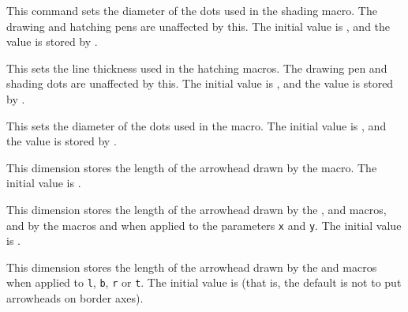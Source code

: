 \documentclass[letterpaper]{article}
\begin{document}
\begin{cd}
%
\end{cd}

This command sets the diameter of the dots used in the shading macro.
The drawing and hatching pens are unaffected by this. The initial value
is \dim{0.5bp}, and the value is stored by \MF{}.

\begin{cd}
%
\end{cd}

This sets the line thickness used in the hatching macros. The drawing
pen and shading dots are unaffected by this. The initial value is
\dim{0.5bp}, and the value is stored by \MF{}.

\begin{cd}
%
\end{cd}

This sets the diameter of the dots used in the  macro. The
initial value is \dim{5bp}, and the value is stored by \MF{}.

\begin{cd}
%
\end{cd}

This dimension stores the length of the arrowhead drawn by the
 macro. The initial value is \dim{3pt}.

\begin{cd}
%
\end{cd}

This dimension stores the length of the arrowhead drawn by the
,  and  macros, and by the macros 
and  when applied to the parameters \texttt{x} and
\texttt{y}. The initial value is \dim{5pt}.

\begin{cd}
%
\end{cd}

This dimension stores the length of the arrowhead drawn by the 
and  macros when applied to \texttt{l}, \texttt{b},
\texttt{r} or \texttt{t}. The initial value is \dim{0pt} (that is, the
default is not to put arrowheads on border axes).
\end{document}
